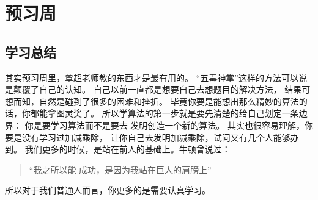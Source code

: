 \newpage
\section{预习周}




\subsection{学习总结}

其实预习周里，覃超老师教的东西才是最有用的。 
``五毒神掌''这样的方法可以说是颠覆了自己的认知。 
自己以前一直都是想要自己去想题目的解决方法， 
结果可想而知，自然是碰到了很多的困难和挫折。 
毕竟你要是能想出那么精妙的算法的话，你都能拿图灵奖了。
所以学算法的第一步就是要先清楚的给自己划定一条边界：
你是要学习算法而不是要去 发明创造一个新的算法。
其实也很容易理解，你要是没有学习过加减乘除，
让你自己去发明加减乘除，试问又有几个人能够办到。
我们更多的时候，是站在前人的基础上。牛顿曾说过：
\begin{quote}
``我之所以能 成功，是因为我站在巨人的肩膀上''
\end{quote}
所以对于我们普通人而言，你更多的是需要认真学习。

